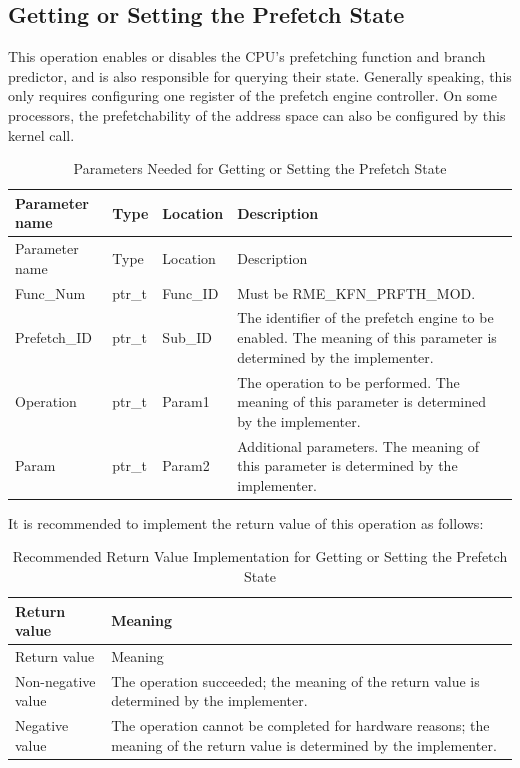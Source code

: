 \subsection{Getting or Setting the Prefetch State}\label{subsec:8-get-or-set-prefetch-state}

This operation enables or disables the CPU's prefetching function and branch predictor, and is also responsible for querying their state. Generally speaking, this only requires configuring one register of the prefetch engine controller. On some processors, the prefetchability of the address space can also be configured by this kernel call.

\begin{xltabular}{\textwidth}{@{}>{\hsize\raggedright\arraybackslash}X>{\hsize\raggedright\arraybackslash}X>{\hsize\raggedright\arraybackslash}X>{\hsize\raggedright\arraybackslash}X@{}}
\caption{Parameters Needed for Getting or Setting the Prefetch State}\label{tab:8-33-get-or-set-prefetch-state-parameters}\\
\toprule
Parameter name & Type & Location & Description\tabularnewline
\endfirsthead
\toprule
Parameter name & Type & Location & Description\tabularnewline
\midrule
\endhead
\bottomrule
\endlastfoot
Func\_Num & ptr\_t & Func\_ID & Must be RME\_KFN\_PRFTH\_MOD.\tabularnewline
Prefetch\_ID & ptr\_t & Sub\_ID &
The identifier of the prefetch engine to be enabled. The meaning of this parameter is determined by the implementer.\tabularnewline
Operation & ptr\_t & Param1 &
The operation to be performed. The meaning of this parameter is determined by the implementer.\tabularnewline
Param & ptr\_t & Param2 &
Additional parameters. The meaning of this parameter is determined by the implementer.\tabularnewline
\end{xltabular}
\nopagebreak[4]

It is recommended to implement the return value of this operation as follows:

\begin{xltabular}{\textwidth}{@{}>{\hsize\raggedright\arraybackslash}X>{\hsize\raggedright\arraybackslash}X@{}}
\caption{Recommended Return Value Implementation for Getting or Setting the Prefetch State}\label{tab:8-34-get-or-set-prefetch-state-suggested-return-values}\\
\toprule
Return value & Meaning\tabularnewline
\endfirsthead
\toprule
Return value & Meaning\tabularnewline
\midrule
\endhead
\bottomrule
\endlastfoot
    Non-negative value & The operation succeeded; the meaning of the return value is determined by the implementer.\tabularnewline
    Negative value & The operation cannot be completed for hardware reasons; the meaning of the return value is determined by the implementer.\tabularnewline
\end{xltabular}
\nopagebreak[4]

